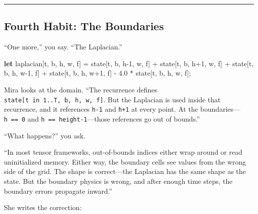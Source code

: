 \documentclass[11pt,]{article}
\newenvironment{Shaded}{}{}
\newcommand{\DecValTok}[1]{\textcolor[rgb]{0.25,0.63,0.44}{#1}}
\newcommand{\KeywordTok}[1]{\textcolor[rgb]{0.00,0.44,0.13}{\textbf{#1}}}
\newcommand{\NormalTok}[1]{#1}
\newcommand{\OperatorTok}[1]{\textcolor[rgb]{0.40,0.40,0.40}{#1}}
\begin{document}
\begin{center}\rule{0.5\linewidth}{0.4pt}\end{center}

\hypertarget{fourth-habit-the-boundaries}{%
\subsection{Fourth Habit: The
Boundaries}\label{fourth-habit-the-boundaries}}

``One more,'' you say. ``The Laplacian.''

\begin{Shaded}
\begin{Highlighting}[]
\KeywordTok{let}\NormalTok{ laplacian}\OperatorTok{[}\NormalTok{t, b, h, w, f}\OperatorTok{]}\NormalTok{ =}
\NormalTok{    state}\OperatorTok{[}\NormalTok{t, b, h-}\DecValTok{1}\NormalTok{, w, f}\OperatorTok{]}\NormalTok{ +}
\NormalTok{    state}\OperatorTok{[}\NormalTok{t, b, h+}\DecValTok{1}\NormalTok{, w, f}\OperatorTok{]}\NormalTok{ +}
\NormalTok{    state}\OperatorTok{[}\NormalTok{t, b, h, w-}\DecValTok{1}\NormalTok{, f}\OperatorTok{]}\NormalTok{ +}
\NormalTok{    state}\OperatorTok{[}\NormalTok{t, b, h, w+}\DecValTok{1}\NormalTok{, f}\OperatorTok{]}\NormalTok{ -}
    \DecValTok{4.0}\NormalTok{ * state}\OperatorTok{[}\NormalTok{t, b, h, w, f}\OperatorTok{]}\NormalTok{;}
\end{Highlighting}
\end{Shaded}

Mira looks at the domain. ``The recurrence defines
\texttt{state{[}t\ in\ 1..T,\ b,\ h,\ w,\ f{]}}. But the Laplacian is
used inside that recurrence, and it references \texttt{h-1} and
\texttt{h+1} at every point. At the boundaries---\texttt{h\ ==\ 0} and
\texttt{h\ ==\ height-1}---those references go out of bounds.''

``What happens?'' you ask.

``In most tensor frameworks, out-of-bounds indices either wrap around or
read uninitialized memory. Either way, the boundary cells see values
from the wrong side of the grid. The shape is correct---the Laplacian
has the same shape as the state. But the boundary physics is wrong, and
after enough time steps, the boundary errors propagate inward.''

She writes the correction:
\end{document}
